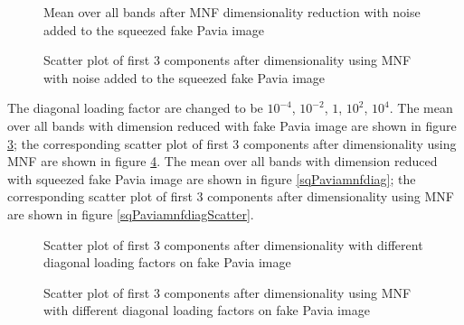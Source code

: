 \documentclass[conference,onecolumn]{IEEEtran}
\begin{document}
\begin{figure}[H]
	\centering
	\caption{Mean over all bands after MNF dimensionality reduction with noise added  to the squeezed fake Pavia image}
	\label{sqPaviamnfmean}
\end{figure}

\begin{figure}[H]
	\centering
	\caption{Scatter plot of first 3 components after dimensionality using MNF with noise added to the squeezed fake Pavia image}
	\label{sqPaviamnfscatter}
\end{figure}

The diagonal loading factor are changed to be $10^{-4}$, $10^{-2}$, $1$, $10^{2}$, $10^{4}$. The mean over all bands with dimension reduced with fake Pavia image are shown in figure \ref{Paviamnfdiag}; the corresponding scatter plot of first 3 components after dimensionality using MNF are shown in figure  \ref{PaviamnfdiagScatter}. The mean over all bands with dimension reduced with squeezed fake Pavia image are shown in figure \ref{sqPaviamnfdiag}; the corresponding scatter plot of first 3 components after dimensionality using MNF are shown in figure  \ref{sqPaviamnfdiagScatter}.

\begin{figure}[H]
	\centering
	\caption{Scatter plot of first 3 components after dimensionality with different diagonal loading factors on fake Pavia image}
	\label{Paviamnfdiag}
\end{figure}

\begin{figure}[H]
	\centering
	\caption{Scatter plot of first 3 components after dimensionality using MNF with different diagonal loading factors on fake Pavia image}
	\label{PaviamnfdiagScatter}
\end{figure}
\end{document}
